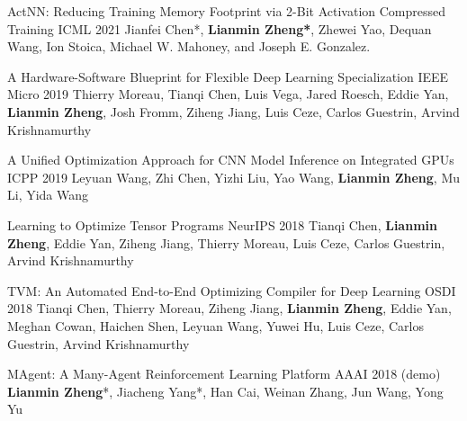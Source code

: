 \begin{cventries}
\cventry
{}
{ActNN: Reducing Training Memory Footprint via 2-Bit Activation Compressed Training} %
{ICML 2021} %
{} %
{Jianfei Chen*, \textbf{Lianmin Zheng*}, Zhewei Yao, Dequan Wang, Ion Stoica, Michael W. Mahoney, and Joseph E. Gonzalez.}

\cventry
{}
{A Hardware-Software Blueprint for Flexible Deep Learning Specialization} %
{IEEE Micro 2019} %
{} %
{Thierry Moreau, Tianqi Chen, Luis Vega, Jared Roesch, Eddie Yan, \textbf{Lianmin Zheng}, Josh Fromm, Ziheng Jiang, Luis Ceze, Carlos Guestrin, Arvind Krishnamurthy}

\cventry
{}
{A Unified Optimization Approach for CNN Model Inference on Integrated GPUs} %
{ICPP 2019} %
{} %
{Leyuan Wang, Zhi Chen, Yizhi Liu, Yao Wang, \textbf{Lianmin Zheng}, Mu Li, Yida Wang}

\cventry
{}
{Learning to Optimize Tensor Programs} %
{NeurIPS 2018} %
{} %
{Tianqi Chen, \textbf{Lianmin Zheng}, Eddie Yan, Ziheng Jiang, Thierry Moreau, Luis Ceze, Carlos Guestrin, Arvind Krishnamurthy}

\cventry
{}
{TVM: An Automated End-to-End Optimizing Compiler for Deep Learning} %
{OSDI 2018} %
{} %
{Tianqi Chen, Thierry Moreau, Ziheng Jiang, \textbf{Lianmin Zheng}, Eddie Yan, Meghan Cowan, Haichen Shen, Leyuan Wang, Yuwei Hu, Luis Ceze, Carlos Guestrin, Arvind Krishnamurthy}

\cventry
{}
{MAgent: A Many-Agent Reinforcement Learning Platform} %
{AAAI 2018 (demo)} %
{} %
{\textbf{Lianmin Zheng}*, Jiacheng Yang*, Han Cai, Weinan Zhang, Jun Wang, Yong Yu}

\end{cventries}